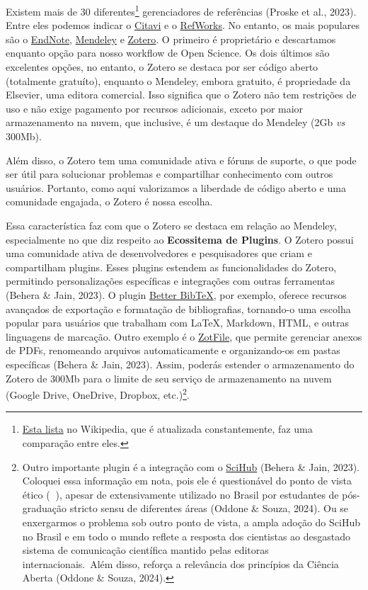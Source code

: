 \documentclass[
  a4paper,
]{article}
\begin{document}
Existem mais de 30 diferentes\footnote{\href{https://en.wikipedia.org/wiki/Comparison_of_reference_management_software}{Esta
  lista} no Wikipedia, que é atualizada constantemente, faz uma
  comparação entre eles.} gerenciadores de referências (Proske et al.,
2023). Entre eles podemos indicar o
\href{https://www.citavi.com/en}{Citavi} e o
\href{https://refworks.proquest.com/learn-more/}{RefWorks}. No entanto,
os mais populares são o \href{https://endnote.com/}{EndNote},
\href{https://www.mendeley.com/reference-management/reference-manager/}{Mendeley}
e \href{https://www.zotero.org/}{Zotero}. O primeiro é proprietário e
descartamos enquanto opção para nosso workflow de Open Science. Os dois
últimos são excelentes opções, no entanto, o Zotero se destaca por ser
código aberto (totalmente gratuíto), enquanto o Mendeley, embora
gratuito, é propriedade da Elsevier, uma editora comercial. Isso
significa que o Zotero não tem restrições de uso e não exige pagamento
por recursos adicionais, exceto por maior armazenamento na nuvem, que
inclusive, é um destaque do Mendeley (2Gb \emph{vs} 300Mb).

Além disso, o Zotero tem uma comunidade ativa e fóruns de suporte, o que
pode ser útil para solucionar problemas e compartilhar conhecimento com
outros usuários. Portanto, como aqui valorizamos a liberdade de código
aberto e uma comunidade engajada, o Zotero é nossa escolha.

Essa característica faz com que o Zotero se destaca em relação ao
Mendeley, especialmente no que diz respeito ao \textbf{Ecossitema de
Plugins}. O Zotero possui uma comunidade ativa de desenvolvedores e
pesquisadores que criam e compartilham plugins. Esses plugins estendem
as funcionalidades do Zotero, permitindo personalizações específicas e
integrações com outras ferramentas (Behera \& Jain, 2023). O plugin
\href{https://retorque.re/zotero-better-bibtex/}{Better BibTeX}, por
exemplo, oferece recursos avançados de exportação e formatação de
bibliografias, tornando-o uma escolha popular para usuários que
trabalham com LaTeX, Markdown, HTML, e outras linguagens de marcação.
Outro exemplo é o \href{https://zotfile.com/}{ZotFile}, que permite
gerenciar anexos de PDFs, renomeando arquivos automaticamente e
organizando-os em pastas específicas (Behera \& Jain, 2023). Assim,
poderás estender o armazenamento do Zotero de 300Mb para o limite de seu
serviço de armazenamento na nuvem (Google Drive, OneDrive, Dropbox,
etc.)\footnote{Outro importante plugin é a integração com o
  \href{https://github.com/ethanwillis/zotero-scihub}{SciHub} (Behera \&
  Jain, 2023). Coloquei essa informação em nota, pois ele é questionável
  do ponto de vista ético (😬🫣), apesar de extensivamente utilizado no
  Brasil por estudantes de pós-graduação stricto sensu de diferentes
  áreas (Oddone \& Souza, 2024). Ou se enxergarmos o problema sob outro
  ponto de vista, a ampla adoção do SciHub no Brasil e em todo o mundo
  reflete a resposta dos cientistas ao desgastado sistema de comunicação
  científica mantido pelas editoras internacionais.~Além disso, reforça
  a relevância dos princípios da Ciência Aberta (Oddone \& Souza, 2024).}.
\end{document}
